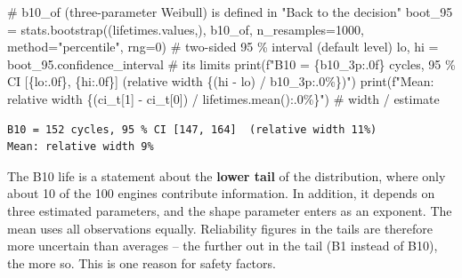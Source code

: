 \documentclass[
  letterpaper,
  DIV=11,
  numbers=noendperiod]{scrreprt}
\newenvironment{Shaded}{\begin{snugshade}}{\end{snugshade}}
\newcommand{\BuiltInTok}[1]{\textcolor[rgb]{0.00,0.23,0.31}{#1}}
\newcommand{\CommentTok}[1]{\textcolor[rgb]{0.37,0.37,0.37}{#1}}
\newcommand{\DecValTok}[1]{\textcolor[rgb]{0.68,0.00,0.00}{#1}}
\newcommand{\NormalTok}[1]{\textcolor[rgb]{0.00,0.23,0.31}{#1}}
\newcommand{\OperatorTok}[1]{\textcolor[rgb]{0.37,0.37,0.37}{#1}}
\newcommand{\SpecialCharTok}[1]{\textcolor[rgb]{0.37,0.37,0.37}{#1}}
\newcommand{\SpecialStringTok}[1]{\textcolor[rgb]{0.13,0.47,0.30}{#1}}
\newcommand{\StringTok}[1]{\textcolor[rgb]{0.13,0.47,0.30}{#1}}
\begin{document}
\begin{tcolorbox}[enhanced jigsaw, left=2mm, title=\textcolor{quarto-callout-caution-color}{\faFire}\hspace{0.5em}{Solution to Exercise 2}, opacityback=0, breakable, rightrule=.15mm, arc=.35mm, toptitle=1mm, colbacktitle=quarto-callout-caution-color!10!white, opacitybacktitle=0.6, coltitle=black, colframe=quarto-callout-caution-color-frame, bottomrule=.15mm, leftrule=.75mm, bottomtitle=1mm, titlerule=0mm, toprule=.15mm, colback=white]

\begin{Shaded}
\begin{Highlighting}[]
\CommentTok{\# b10\_of (three{-}parameter Weibull) is defined in "Back to the decision"}
\NormalTok{boot\_95 }\OperatorTok{=}\NormalTok{ stats.bootstrap((lifetimes.values,), b10\_of, n\_resamples}\OperatorTok{=}\DecValTok{1000}\NormalTok{,}
\NormalTok{                          method}\OperatorTok{=}\StringTok{"percentile"}\NormalTok{, rng}\OperatorTok{=}\DecValTok{0}\NormalTok{)            }\CommentTok{\# two{-}sided 95 \% interval (default level)}
\NormalTok{lo, hi }\OperatorTok{=}\NormalTok{ boot\_95.confidence\_interval                             }\CommentTok{\# its limits}
\BuiltInTok{print}\NormalTok{(}\SpecialStringTok{f"B10 = }\SpecialCharTok{\{}\NormalTok{b10\_3p}\SpecialCharTok{:.0f\}}\SpecialStringTok{ cycles, 95 \% CI [}\SpecialCharTok{\{}\NormalTok{lo}\SpecialCharTok{:.0f\}}\SpecialStringTok{, }\SpecialCharTok{\{}\NormalTok{hi}\SpecialCharTok{:.0f\}}\SpecialStringTok{]  (relative width }\SpecialCharTok{\{}\NormalTok{(hi }\OperatorTok{{-}}\NormalTok{ lo) }\OperatorTok{/}\NormalTok{ b10\_3p}\SpecialCharTok{:.0\%\}}\SpecialStringTok{)"}\NormalTok{)}
\BuiltInTok{print}\NormalTok{(}\SpecialStringTok{f"Mean: relative width }\SpecialCharTok{\{}\NormalTok{(ci\_t[}\DecValTok{1}\NormalTok{] }\OperatorTok{{-}}\NormalTok{ ci\_t[}\DecValTok{0}\NormalTok{]) }\OperatorTok{/}\NormalTok{ lifetimes}\SpecialCharTok{.}\NormalTok{mean()}\SpecialCharTok{:.0\%\}}\SpecialStringTok{"}\NormalTok{)   }\CommentTok{\# width / estimate}
\end{Highlighting}
\end{Shaded}

\begin{verbatim}
B10 = 152 cycles, 95 % CI [147, 164]  (relative width 11%)
Mean: relative width 9%
\end{verbatim}

The B10 life is a statement about the \textbf{lower tail} of the
distribution, where only about 10 of the 100 engines contribute
information. In addition, it depends on three estimated parameters, and
the shape parameter enters as an exponent. The mean uses all
observations equally. Reliability figures in the tails are therefore
more uncertain than averages -- the further out in the tail (B1 instead
of B10), the more so. This is one reason for safety factors.

\end{tcolorbox}
\end{document}
